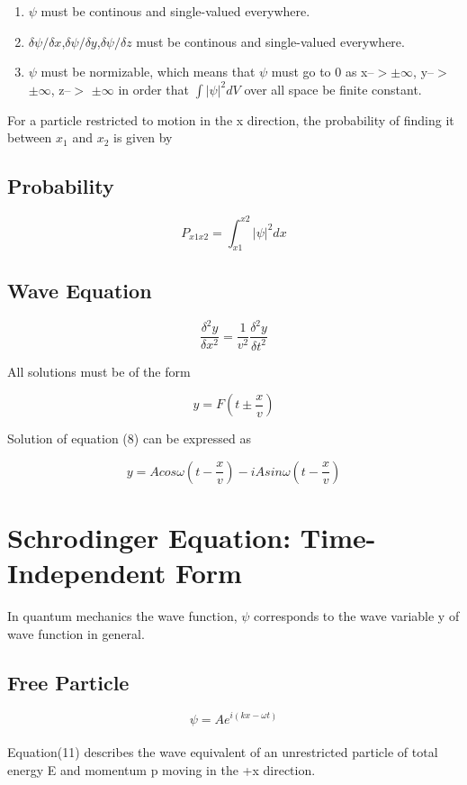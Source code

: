 \documentclass{article}
\begin{document}
\begin{enumerate}
    \item $\psi$ must be continous and single-valued everywhere.
    \item $\delta\psi/\delta x$,$\delta\psi/\delta y$,$\delta\psi/\delta z$ must be continous and single-valued everywhere.
    \item $\psi$ must be normizable, which means that $\psi$ must go to 0 as x--$>$$\pm\infty$, y--$>$ $\pm\infty$, z--$>$ $\pm\infty$ in order that $\int |\psi|^2 dV$ over all space be finite constant.
    

\end{enumerate}



For a particle restricted to motion in the x direction, the probability of finding it between $x_1$ and $x_2$ is given by

\subsection{Probability}

\begin{equation}
    P_{{x1}{x2}}=\int_{x1}^{x2}|\psi|^2dx
\end{equation}

\subsection{Wave Equation}

\begin{equation}
    \frac{\delta^2y}{\delta x^2}=\frac{1}{v^2}\frac{\delta^2y}{\delta t^2}
\end{equation}

All solutions must be of the form

\begin{equation}
    y=F(t\pm\frac{x}{v})
\end{equation}

Solution of equation (8) can be expressed as 

\begin{equation}
    y=Acos\omega(t-\frac{x}{v})-iAsin\omega(t-\frac{x}{v})
\end{equation}


\section{Schrodinger Equation: Time-Independent Form}  

In quantum mechanics the wave function, $\psi$ corresponds to the wave variable y of wave function in general.

\subsection*{Free Particle}
\begin{equation}
    \psi=Ae^{i(kx-\omega t)}
\end{equation}
\\
Equation(11) describes the wave equivalent of an unrestricted particle of total energy E and momentum p moving in the +x direction.
\end{document}
